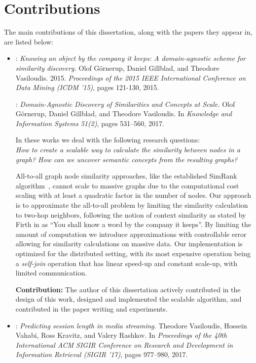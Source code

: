 \section{Contributions}

The main contributions of this dissertation, along with the papers they appear in,
are listed below:

\begin{itemize}
	\item \textbf{\conceptsicdm}: \emph{Knowing an object by the company it keeps: A domain-agnostic scheme for similarity discovery.}
	Olof G\"{o}rnerup, Daniel Gillblad, and Theodore Vasiloudis. 2015.
	\emph{Proceedings of the 2015 IEEE International Conference on Data Mining (ICDM '15)}, pages 121-130, 2015.

	\vspace{2pt}
	\textbf{\conceptskais}: \emph{Domain-Agnostic Discovery of Similarities and Concepts at Scale.}
	Olof G\"{o}rnerup, Daniel Gillblad, and Theodore Vasiloudis. In \emph{Knowledge and
	Information Systems 51(2)}, pages 531--560, 2017.

	In these works we deal with the following research questions:\\
	\emph{How to create a scalable way to calculate the similarity between nodes
	in a graph? How can we uncover semantic concepts from the resulting graphs?
	}

	All-to-all graph node similarity approaches, like the established SimRank algorithm~\cite{simrank},
	cannot scale to massive graphs due to the computational cost scaling with at least a quadratic
	factor in the number of nodes. Our approach is to approximate the all-to-all problem
	by limiting the similarity calculation to two-hop neighbors, following the
	notion of context similarity as stated by Firth in \cite{firth} as ``You shall know
	a word by the company it keeps''. By limiting the amount of computation we introduce
	approximations with controllable error allowing for similarity calculations on massive
	data. Our implementation is optimized for the distributed setting, with its most
	expensive operation being a \emph{self-join} operation that has linear speed-up and
	constant scale-up, with limited communication.

	\textbf{Contribution:} The author of this dissertation actively contributed
	in the design of this work, designed and implemented the scalable algorithm, and contributed in
	the paper writing and experiments.

	\item \textbf{\sessionlength}:
	\emph{Predicting session length in media streaming.} Theodore Vasiloudis, Hossein Vahabi, Ross Kravitz, and Valery Rashkov. In \emph{Proceedings of the 40th
	International ACM SIGIR Conference on Research and Development in Information
	Retrieval (SIGIR '17)}, pages 977--980, 2017.


\end{itemize}
